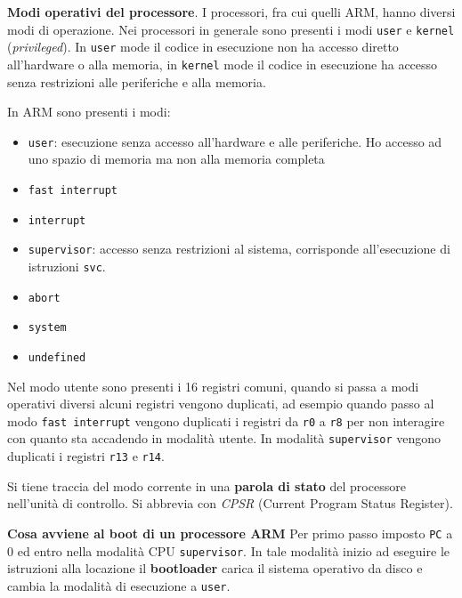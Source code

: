 \begin{defn}
    \textbf{Modi operativi del processore}.
    I processori, fra cui quelli ARM, hanno diversi modi di operazione. Nei processori in generale
    sono presenti i modi \texttt{user} e \texttt{kernel} (\textit{privileged}). In \texttt{user} mode
    il codice in esecuzione non ha accesso diretto all'hardware o alla memoria, in \texttt{kernel} mode
    il codice in esecuzione ha accesso senza restrizioni alle periferiche e alla memoria.

    In ARM sono presenti i modi:
    \begin{itemize}
        \item \texttt{user}: esecuzione senza accesso all'hardware e alle periferiche.
        Ho accesso ad uno spazio di memoria ma non alla memoria completa
        \item \texttt{fast interrupt}
        \item \texttt{interrupt}
        \item \texttt{supervisor}: accesso senza restrizioni al sistema, corrisponde all'esecuzione
        di istruzioni \texttt{svc}.
        \item \texttt{abort}
        \item \texttt{system}
        \item \texttt{undefined}
    \end{itemize}

    Nel modo utente sono presenti i 16 registri comuni, quando si passa a modi operativi diversi
    alcuni registri vengono duplicati, ad esempio quando passo al modo \texttt{fast interrupt} vengono duplicati
    i registri da \texttt{r0} a \texttt{r8} per non interagire con quanto sta accadendo in modalità utente.
    In modalità \texttt{supervisor} vengono duplicati i registri \texttt{r13} e \texttt{r14}.

    Si tiene traccia del modo corrente in una \textbf{parola di stato} del processore nell'unità di controllo.
    Si abbrevia con \textit{CPSR} (Current Program Status Register).

\end{defn}


\begin{defn}
    \textbf{Cosa avviene al boot di un processore ARM}
    Per primo passo imposto \texttt{PC} a 0 ed entro nella modalità CPU \texttt{supervisor}.
    In tale modalità inizio ad eseguire le istruzioni alla locazione il \textbf{bootloader} carica il
    sistema operativo da disco e cambia la modalità di esecuzione a \texttt{user}.
\end{defn}


